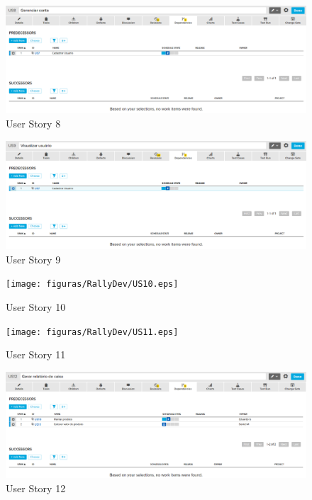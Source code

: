 \begin{figure}[h]
    \centering
    \label{fig01}
        \includegraphics[keepaspectratio=true,scale=0.3]{figuras/RallyDev/US8.eps}
    \caption{User Story 8}
\end{figure}

\begin{figure}[h]
    \centering
    \label{fig01}
        \includegraphics[keepaspectratio=true,scale=0.3]{figuras/RallyDev/US9.eps}
    \caption{User Story 9}
\end{figure}

\begin{figure}[h]
    \centering
    \label{fig01}
        \texttt{[image: figuras/RallyDev/US10.eps]}
    \caption{User Story 10}
\end{figure}

\begin{figure}[h]
    \centering
    \label{fig01}
        \texttt{[image: figuras/RallyDev/US11.eps]}
    \caption{User Story 11}
\end{figure}

\begin{figure}[h]
    \centering
    \label{fig01}
        \includegraphics[keepaspectratio=true,scale=0.3]{figuras/RallyDev/US12.eps}
    \caption{User Story 12}
\end{figure}

